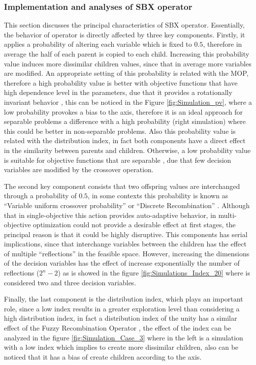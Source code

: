\subsubsection{Implementation and analyses of SBX operator}
This section discusses the principal characteristics of SBX operator.
%
Essentially, the behavior of operator is directly affected by three key components.
%
Firstly, it applies a probability of altering each variable which is fixed to $0.5$, therefore in average the half of each parent is copied to each child.
%
Increasing this probability value induces more dissimilar children values, since that in average more variables are modified.
%
An appropriate setting of this probability is related with the MOP, therefore a high probability value is better with objective functions that have high dependence level in the parameters, due that it provides a rotationally invariant behavior \cite{price2006differential}, this can be noticed in the Figure \ref{fig:Simulation_pv}, where a low probability provokes a bias to the axis, therefore it is an ideal approach for separable problems a difference with a high probability (right simulation) where this could be better in non-separable problems.
%
Also this probability value is related with the distribution index, in fact both components have a direct effect in the similarity between parents and children.
%
Otherwise, a low probability value is suitable for objective functions that are separable \cite{ma2016multiobjective}, due that few decision variables are modified by the crossover operation.
%

The second key component consists that two offspring values are interchanged through a probability of $0.5$, in some contexts this probability is known as ``Variable uniform crossover probability'' \cite{tuvsar2007differential} or ``Discrete Recombination'' \cite{muhlenbein1993predictive}.
%
Although that in single-objective this action provides auto-adaptive behavior, in multi-objective optimization could not provide a desirable effect at first stages, the principal reason is that it could be highly disruptive.
%
This components has serial implications, since that interchange variables between the children has the effect of multiple ``reflections'' in the feasible space.
%
However, increasing the dimensions of the decision variables has the effect of increase exponentially the number of reflections ($2^{n}-2$) as is showed in the figure \ref{fig:Simulations_Index_20} where is considered two and three decision variables.
%

Finally, the last component is the distribution index, which plays an important role, since a low index results in a greater exploration level than considering a high distribution index, in fact a distribution index of the unity has a similar effect of the Fuzzy Recombination Operator \cite{voigt1995fuzzy}, the effect of the index can be analyzed in the figure \ref{fig:Simulation_Case_3} where in the left is a simulation with a low index which implies to create more dissimilar children, also can be noticed that it has a bias of create children according to the axis.
%

